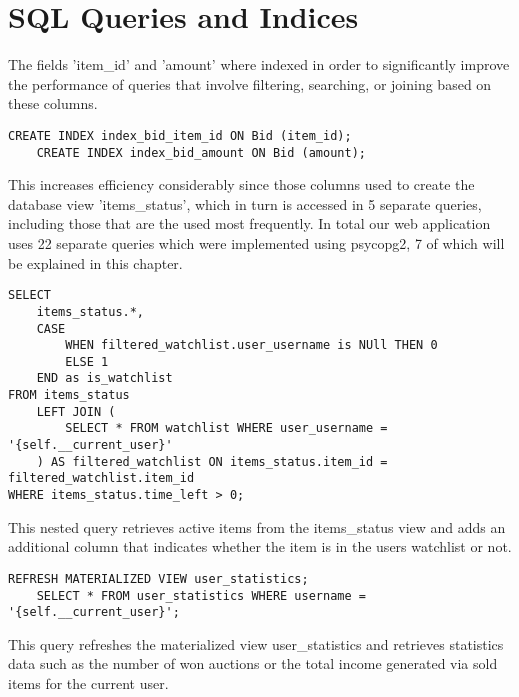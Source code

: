 
\chapter{SQL Queries and Indices}
The fields 'item\_id' and 'amount' where indexed in order to significantly improve the performance of queries that involve filtering, searching, or joining based on these columns. 

\begin{lstlisting}[style=sqlStyle]
	CREATE INDEX index_bid_item_id ON Bid (item_id);
	CREATE INDEX index_bid_amount ON Bid (amount);
\end{lstlisting}

This increases efficiency considerably since those columns used to create the database view 'items\_status', which in turn is accessed in 5 separate queries, including those that are the used most frequently. In total our web application uses 22 separate queries which were implemented using psycopg2, 7 of which will be explained in this chapter.

\begin{lstlisting}[style=sqlStyle]
SELECT 
	items_status.*,
	CASE
		WHEN filtered_watchlist.user_username is NUll THEN 0
		ELSE 1
	END as is_watchlist
FROM items_status 
	LEFT JOIN (
		SELECT * FROM watchlist WHERE user_username = '{self.__current_user}'
	) AS filtered_watchlist ON items_status.item_id = filtered_watchlist.item_id 
WHERE items_status.time_left > 0;
\end{lstlisting}

This nested query retrieves active items from the items\_status view and adds an additional column that indicates whether the item is in the users watchlist or not.

\begin{lstlisting}[style=sqlStyle]
	REFRESH MATERIALIZED VIEW user_statistics;
	SELECT * FROM user_statistics WHERE username = '{self.__current_user}';
\end{lstlisting}
This query refreshes the materialized view user\_statistics and retrieves statistics data such as the number of won auctions or the total income generated via sold items for the current user.

